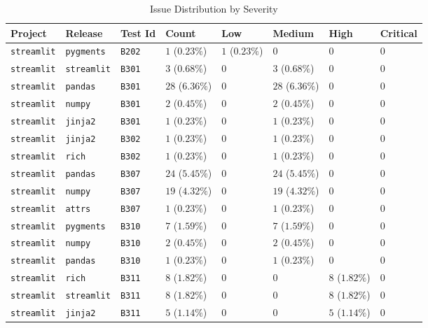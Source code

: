 \begin{table}
\caption{Issue Distribution by Severity}
\label{tab:issue-distribution}
\begin{tabular}{llllllll}
\toprule
Project & Release & Test Id & Count & Low & Medium & High & Critical \\
\midrule
\texttt{streamlit} & \texttt{pygments} & \texttt{B202} & $1$ ($0.23\%$) & $1$ ($0.23\%$) & $0$ & $0$ & $0$ \\
\texttt{streamlit} & \texttt{streamlit} & \texttt{B301} & $3$ ($0.68\%$) & $0$ & $3$ ($0.68\%$) & $0$ & $0$ \\
\texttt{streamlit} & \texttt{pandas} & \texttt{B301} & $28$ ($6.36\%$) & $0$ & $28$ ($6.36\%$) & $0$ & $0$ \\
\texttt{streamlit} & \texttt{numpy} & \texttt{B301} & $2$ ($0.45\%$) & $0$ & $2$ ($0.45\%$) & $0$ & $0$ \\
\texttt{streamlit} & \texttt{jinja2} & \texttt{B301} & $1$ ($0.23\%$) & $0$ & $1$ ($0.23\%$) & $0$ & $0$ \\
\texttt{streamlit} & \texttt{jinja2} & \texttt{B302} & $1$ ($0.23\%$) & $0$ & $1$ ($0.23\%$) & $0$ & $0$ \\
\texttt{streamlit} & \texttt{rich} & \texttt{B302} & $1$ ($0.23\%$) & $0$ & $1$ ($0.23\%$) & $0$ & $0$ \\
\texttt{streamlit} & \texttt{pandas} & \texttt{B307} & $24$ ($5.45\%$) & $0$ & $24$ ($5.45\%$) & $0$ & $0$ \\
\texttt{streamlit} & \texttt{numpy} & \texttt{B307} & $19$ ($4.32\%$) & $0$ & $19$ ($4.32\%$) & $0$ & $0$ \\
\texttt{streamlit} & \texttt{attrs} & \texttt{B307} & $1$ ($0.23\%$) & $0$ & $1$ ($0.23\%$) & $0$ & $0$ \\
\texttt{streamlit} & \texttt{pygments} & \texttt{B310} & $7$ ($1.59\%$) & $0$ & $7$ ($1.59\%$) & $0$ & $0$ \\
\texttt{streamlit} & \texttt{numpy} & \texttt{B310} & $2$ ($0.45\%$) & $0$ & $2$ ($0.45\%$) & $0$ & $0$ \\
\texttt{streamlit} & \texttt{pandas} & \texttt{B310} & $1$ ($0.23\%$) & $0$ & $1$ ($0.23\%$) & $0$ & $0$ \\
\texttt{streamlit} & \texttt{rich} & \texttt{B311} & $8$ ($1.82\%$) & $0$ & $0$ & $8$ ($1.82\%$) & $0$ \\
\texttt{streamlit} & \texttt{streamlit} & \texttt{B311} & $8$ ($1.82\%$) & $0$ & $0$ & $8$ ($1.82\%$) & $0$ \\
\texttt{streamlit} & \texttt{jinja2} & \texttt{B311} & $5$ ($1.14\%$) & $0$ & $0$ & $5$ ($1.14\%$) & $0$ \\

\end{tabular}
\end{table}
